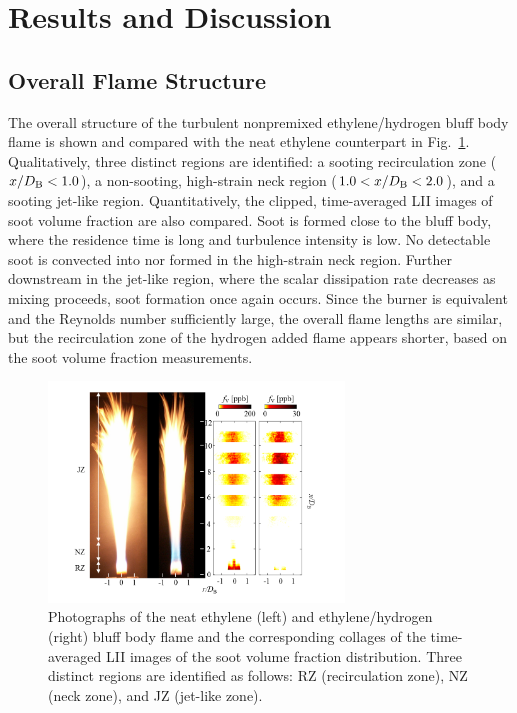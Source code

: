 \section{Results and Discussion}

\subsection{Overall Flame Structure}

The overall structure of the turbulent nonpremixed ethylene/hydrogen bluff body flame is shown and compared with the neat ethylene counterpart in Fig.~\ref{fig:H2_overall}.  Qualitatively, three distinct regions are identified: a sooting recirculation zone ($x/D_{\rm B} < 1.0$), a non-sooting, high-strain neck region ($1.0 < x/D_{\rm B} < 2.0$), and a sooting jet-like region.  Quantitatively, the clipped, time-averaged LII images of soot volume fraction are also compared.  Soot is formed close to the bluff body, where the residence time is long and turbulence intensity is low.  No detectable soot is convected into nor formed in the high-strain neck region.   Further downstream in the jet-like region, where the scalar dissipation rate decreases as mixing proceeds, soot formation once again occurs.  Since the burner is equivalent and the Reynolds number sufficiently large, the overall flame lengths are similar, but the recirculation zone of the hydrogen added flame appears shorter, based on the soot volume fraction measurements.

\begin{figure}[t]
  \centering
  \scriptsize
  \includegraphics[trim=14mm 5.0mm 14mm 5mm, clip=true, width=0.7\textwidth]{ch-bluff/hy_overall_new.png}
  \normalsize
  \caption{Photographs of the neat ethylene (left) and ethylene/hydrogen (right) bluff body flame and the corresponding collages of the time-averaged LII images of the soot volume fraction distribution.  Three distinct regions are identified as follows: RZ (recirculation zone), NZ (neck zone), and JZ (jet-like zone).}
  \label{fig:H2_overall}
\end{figure}

